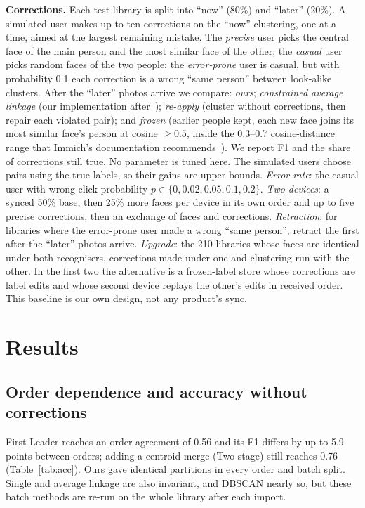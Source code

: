 \documentclass[conference]{IEEEtran}
\begin{document}
\textbf{Corrections.} Each test library is split into ``now'' (80\%) and ``later'' (20\%). A simulated user makes up to ten
corrections on the ``now'' clustering, one at a time, aimed at the largest remaining mistake. The \emph{precise} user picks
the central face of the main person and the most similar face of the other; the \emph{casual} user picks random faces of the
two people; the \emph{error-prone} user is casual, but with probability 0.1 each correction is a wrong ``same person''
between look-alike clusters. After the ``later'' photos arrive we compare: \emph{ours}; \emph{constrained average
linkage} (our implementation after~\cite{davidson2005agglomerative}); \emph{re-apply} (cluster without corrections, then
repair each violated pair); and \emph{frozen} (earlier people kept, each new face joins its most similar face's person at
cosine $\ge0.5$, inside the 0.3--0.7 cosine-distance range that Immich's documentation recommends~\cite{immichdocs}). We report F1 and the share of corrections still true. No parameter is tuned here. The simulated users choose pairs using the true labels, so their gains are upper bounds.
\emph{Error rate}: the casual user with wrong-click probability $p\in\{0,0.02,0.05,0.1,0.2\}$.
\emph{Two devices}: a synced 50\% base, then 25\% more faces per device in its own order and up to five precise corrections,
then an exchange of faces and corrections. \emph{Retraction}: for libraries where the error-prone user made a wrong ``same
person'', retract the first after the ``later'' photos arrive. \emph{Upgrade}: the 210 libraries whose faces are identical
under both recognisers, corrections made under one and clustering run with the other. In the first two the alternative is
a frozen-label store whose corrections are label edits and whose second device replays the other's edits in received order.
This baseline is our own design, not any product's sync.

\section{Results}
\subsection{Order dependence and accuracy without corrections}\label{sec:acc}
First-Leader reaches an order agreement of 0.56 and its F1 differs by up to 5.9 points between orders; adding a centroid
merge (Two-stage) still reaches 0.76 (Table~\ref{tab:acc}). Ours gave identical partitions in every order and batch split.
Single and average linkage are also invariant, and DBSCAN nearly so, but these batch methods are re-run on the whole library
after each import.
\end{document}
